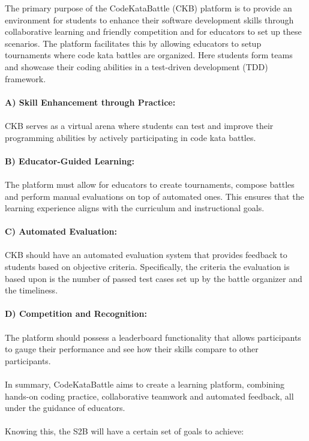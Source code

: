 \documentclass{article}
\begin{document}
The primary purpose of the CodeKataBattle (CKB) platform is to provide an environment 
for students to enhance their software development skills through collaborative 
learning and friendly competition and for educators to set up these scenarios. The platform facilitates 
this by allowing educators to setup tournaments where code kata battles are organized. Here students 
form teams and showcase their coding abilities in a test-driven development (TDD) framework.
\\ \\
\textbf{A) Skill Enhancement through Practice:}
\\ \\
\indent CKB serves as a virtual arena where students can test and improve their programming abilities by actively 
participating in code kata battles.
\\ \\
\textbf{B) Educator-Guided Learning:}
\\ \\
\indent The platform must allow for educators to create tournaments, compose battles and perform manual evaluations
on top of automated ones. This ensures that the learning experience aligns with the curriculum and instructional goals.
\\ \\
\textbf{C) Automated Evaluation:}
\\ \\
\indent CKB should have an automated evaluation system that provides feedback to students based on
 objective criteria. Specifically, the criteria the evaluation is based upon is the number of passed test cases 
 set up by the battle organizer and the timeliness. 
\\ \\
\textbf{D) Competition and Recognition:}
\\ \\
\indent The platform should possess a leaderboard functionality that allows participants to 
gauge their performance and see how their skills compare to other participants.
\\ \\
\indent In summary, CodeKataBattle aims to create a learning platform, combining 
hands-on coding practice, collaborative teamwork and automated feedback, all under the 
guidance of educators. 
\\ \\
\indent Knowing this, the S2B will have a certain set of goals to achieve:
\end{document}
